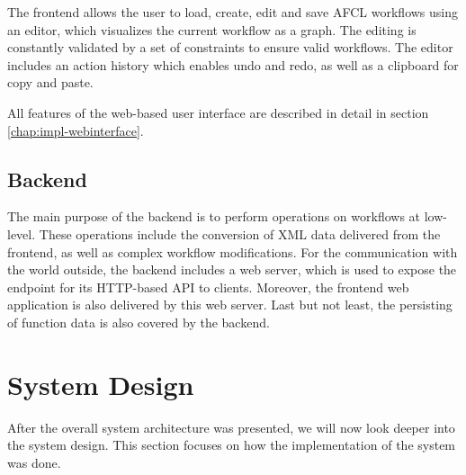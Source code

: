 \documentclass[a4paper,top=25mm,bottom=25mm,12pt,pdftex,halfparskip,twoside,bibtotoc,numbers=noenddot]{scrbook}
\begin{document}
The frontend allows the user to load, create, edit and save AFCL workflows using an editor, which visualizes the current workflow as a graph. The editing is constantly validated by a set of constraints to ensure valid workflows. The editor includes an action history which enables undo and redo, as well as a clipboard for copy and paste.

All features of the web-based user interface are described in detail in section \ref{chap:impl-webinterface}.




\subsection{Backend}

The main purpose of the backend is to perform operations on workflows at low-level. These operations include the conversion of XML data delivered from the frontend, as well as complex workflow modifications.
For the communication with the world outside, the backend includes a web server, which is used to expose the endpoint for its HTTP-based API to clients. Moreover, the frontend web application is also delivered by this web server. 
Last but not least, the persisting of function data is also covered by the backend.




\section{System Design}

After the overall system architecture was presented, we will now look deeper into the system design.
This  section  focuses on how the implementation of the system was done.
\end{document}
